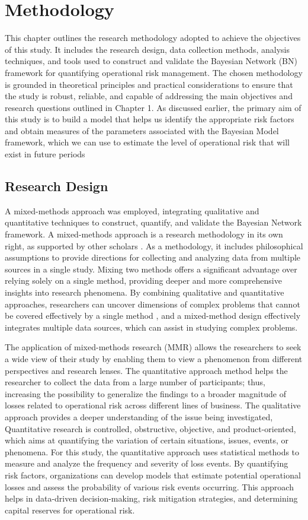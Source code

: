 \chapter{Methodology}
This chapter outlines the research methodology adopted to achieve the objectives of this study. It includes the research design, data collection methods, analysis techniques, and tools used to construct and validate the Bayesian Network (BN) framework for quantifying operational risk management. The chosen methodology is grounded in theoretical principles and practical considerations to ensure that the study is robust, reliable, and capable of addressing the main objectives and research questions outlined in Chapter 1. As discussed earlier, the primary aim of this study is to build a model that helps us identify the appropriate risk factors and obtain measures of the parameters associated with the Bayesian Model framework, which we can use to estimate the level of operational risk that will exist in future periods
\section{Research Design}
A mixed-methods approach was employed, integrating qualitative and quantitative techniques to construct, quantify, and validate the Bayesian Network framework. A mixed-methods approach is a research methodology in its own right, as supported by other scholars \parencite{dawadi_mixed-methods_2021}. As a methodology, it includes philosophical assumptions to provide directions for collecting and analyzing data from multiple sources in a single study. Mixing two methods offers a significant advantage over relying solely on a single method, providing deeper and more comprehensive insights into research phenomena. By combining qualitative and quantitative approaches, researchers can uncover dimensions of complex problems that cannot be covered effectively by a single method \textcite{Poth2020}, and a mixed-method design effectively integrates multiple data sources, which can assist in studying complex problems.

The application of mixed-methods research (MMR) allows the researchers to seek a wide view of their study by enabling them to view a phenomenon from different perspectives and research lenses. The quantitative approach method helps the researcher to collect the data from a large number of participants; thus, increasing the possibility to generalize the findings to a broader magnitude of losses related to operational risk across different lines of business. The qualitative approach provides a deeper understanding of the issue being investigated, Quantitative research is controlled, obstructive, objective, and product-oriented, which aims at quantifying the variation of certain situations, issues, events, or phenomena. For this study, the quantitative approach uses statistical methods to measure and analyze the frequency and severity of loss events. By quantifying risk factors, organizations can develop models that estimate potential operational losses and assess the probability of various risk events occurring. This approach helps in data-driven decision-making, risk mitigation strategies, and determining capital reserves for operational risk. 

